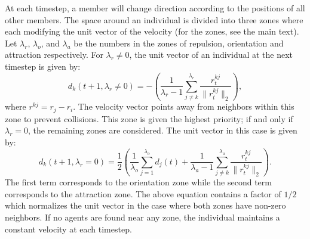 At each timestep, a member will change direction according to the positions of all other members. The space around an individual is divided into three zones where each modifying the unit vector of the velocity (for the zones, see the main text).
Let $\lambda_r$, $\lambda_o$, and $\lambda_a$ be the numbers in the zones of repulsion, orientation and attraction respectively. For $\lambda_r \neq 0$, the unit vector of an individual at the next timestep is given by:
\begin{equation} 
\label{eq:boid1}
d_k(t+1 , \lambda_r \neq 0 )=-\left(\frac{1}{\lambda_r-1}\sum_{j\neq k}^{\lambda_r}\frac{r^{kj}_t}{\|r^{kj}_t\|_2}\right),
\end{equation} 
where $r^{kj}={r}_j-{r}_i$.
The velocity vector points away from neighbors within this zone to prevent collisions. This zone is given the highest priority; if and only if $\lambda_r = 0$, the remaining zones are considered. 
The unit vector in this case is given by:
\begin{equation} 
\label{eq:boid2}
d_k(t+1 , {\lambda}_r=0)=\frac{1}{2}\left(\frac{1}{\lambda_o}\sum_{j=1}^{\lambda_o} d_j(t)+\frac{1}{\lambda_a-1}\sum_{j\neq k}^{{\lambda}_a}\frac{r^{kj}_t}{\|r^{kj}_t\|_2}\right).
\end{equation} 
The first term corresponds to the orientation zone while the second term corresponds to the attraction zone. The above equation contains a factor of $1/2$ which normalizes the unit vector in the case where both zones have non-zero neighbors. If no agents are found near any zone, the individual maintains a constant velocity at each timestep.

